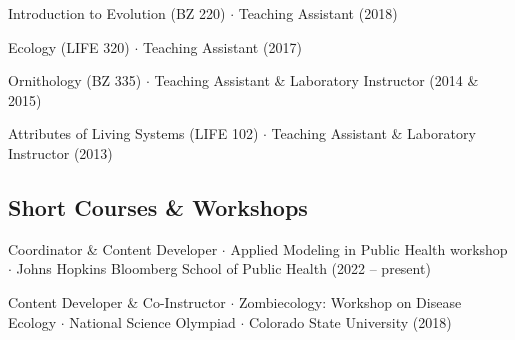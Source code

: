 \documentclass{cv}
\begin{document}
Introduction to Evolution (BZ 220) $\cdot$ Teaching Assistant (2018)

Ecology (LIFE 320) $\cdot$ Teaching Assistant (2017)

Ornithology (BZ 335) $\cdot$ Teaching Assistant \& Laboratory Instructor (2014 \& 2015)

Attributes of Living Systems (LIFE 102) $\cdot$ Teaching Assistant \& Laboratory Instructor (2013)

\subsection*{Short Courses \& Workshops}

Coordinator \& Content Developer $\cdot$ Applied Modeling in Public Health workshop $\cdot$ Johns Hopkins Bloomberg School of Public Health (2022 -- present)

Content Developer \& Co-Instructor $\cdot$ Zombiecology: Workshop on Disease Ecology $\cdot$ National Science Olympiad $\cdot$ Colorado State University (2018)








\newpage
{}
\partthree

\end{document}
